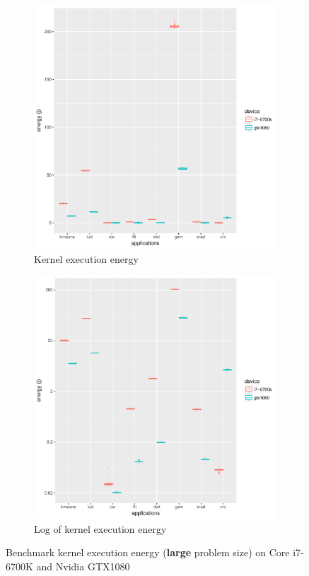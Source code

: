 \documentclass[../document.tex]{subfiles}
\begin{document}
\begin{figure}[htb]
\begin{subfigure}{.49\textwidth}
\centering
\includegraphics[width=1\textwidth]{figures/energy-results/energy_charts.pdf}
\caption{Kernel execution energy}
\label{fig:energy}
\end{subfigure}
\hfill
\begin{subfigure}{.49\textwidth}
\centering
\includegraphics[width=1\textwidth]{figures/energy-results/energy_charts_log10.pdf}
\caption{Log of kernel execution energy}
\label{fig:energy-log}
\end{subfigure}
\caption{Benchmark kernel execution energy ({\bf large} problem size) on Core i7-6700K and Nvidia GTX1080}
\end{figure}
\end{document}
